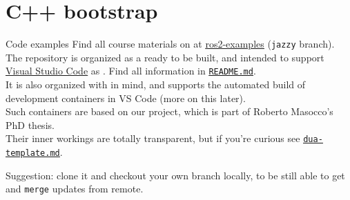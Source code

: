 
\section{C++ bootstrap}
\graphicspath{{figs/section2/}}

\begin{frame}{Code examples}
	Find all course materials on  at \href{https://github.com/IntelligentSystemsLabUTV/ros2-examples}{\color{blue}\underline{ros2-examples}} (\texttt{jazzy} branch).\\
	\bigskip
	The repository is organized as a  ready to be built, and intended to support \href{https://code.visualstudio.com/}{\color{blue}\underline{Visual Studio Code}} as . Find all information in \href{https://github.com/IntelligentSystemsLabUTV/ros2-examples/blob/jazzy/README.md}{\color{blue}\underline{\texttt{README.md}}}.\\
	\bigskip
	It is also organized with  in mind, and supports the automated build of development containers in VS Code (more on this later).\\
	Such containers are based on our \href{https://github.com/dotX-Automation/dua-template}{} project, which is part of Roberto Masocco's PhD thesis.\\
	Their inner workings are totally transparent, but if you're curious see \href{https://github.com/IntelligentSystemsLabUTV/ros2-examples/blob/jazzy/dua-template.md}{\color{blue}\underline{\texttt{dua-template.md}}}.
	\begin{block}{}
		\centering
		Suggestion: clone it and checkout your own branch locally, to be still able to get and \texttt{merge} updates from remote.
	\end{block}
\end{frame}

